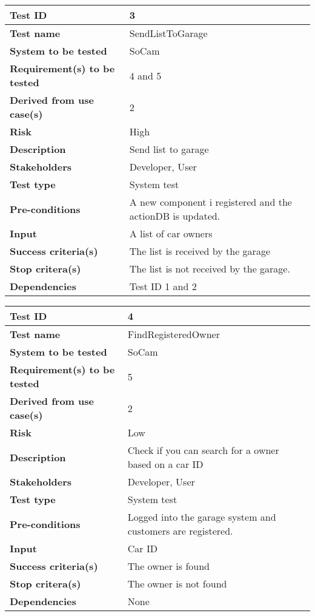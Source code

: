 				\begin{table}[H]
			\begin{tabular}{| p{4cm} | p{10cm} |}
			\hline
			\rowcolor{gray}
				{\bf Test ID} & 3 \\ \hline
				{\bf Test name} & SendListToGarage \\ \hline
				{\bf System to be tested} & SoCam \\ \hline
				{\bf Requirement(s) to be tested} & 4 and 5 \\ \hline
				{\bf Derived from use case(s)} & 2 \\ \hline
				{\bf Risk} & High \\ \hline
				{\bf Description} & Send list to garage
				\\ \hline
				{\bf Stakeholders} & Developer, User \\ \hline
				{\bf Test type} & System test \\ \hline
				{\bf Pre-conditions} & A new component i registered and the actionDB is updated. 
				\\ \hline
				{\bf Input} & A list of car owners \\ \hline
				{\bf Success criteria(s)} & The list is received by the garage
				\\ \hline
				{\bf Stop critera(s)} &  The list is not received by the garage. \\ \hline
				{\bf Dependencies} & Test ID 1 and 2 \\ \hline
			\end{tabular}
		\end{table}

		\begin{table}[H]
			\begin{tabular}{| p{4cm} | p{10cm} |}
			\hline
			\rowcolor{gray}
				{\bf Test ID} & 4 \\ \hline
				{\bf Test name} & FindRegisteredOwner\\ \hline
				{\bf System to be tested} & SoCam \\ \hline
				{\bf Requirement(s) to be tested} & 5 \\ \hline
				{\bf Derived from use case(s)} & 2 \\ \hline
				{\bf Risk} & Low \\ \hline
				{\bf Description} & Check if you can search for a owner based 
				on a car ID \\ \hline
				{\bf Stakeholders} & Developer, User \\ \hline
				{\bf Test type} & System test \\ \hline
				{\bf Pre-conditions} & Logged into the garage system and 
				customers are registered.\\ \hline
				{\bf Input} & Car ID \\ \hline
				{\bf Success criteria(s)} & The owner is found \\ \hline
				{\bf Stop critera(s)} & The owner is not found \\ \hline
				{\bf Dependencies} & None \\ \hline
			\end{tabular}
		\end{table}

